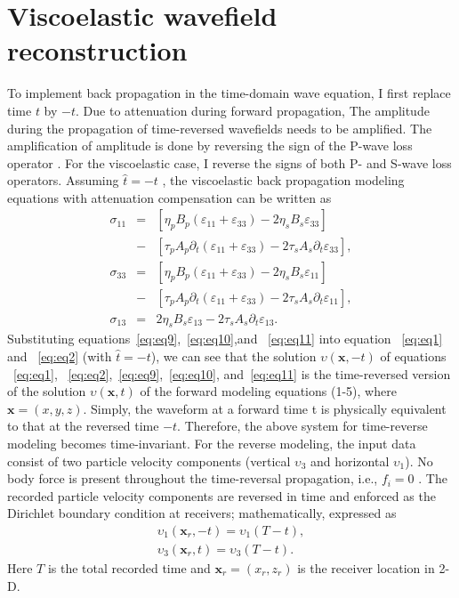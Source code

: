 \section{Viscoelastic wavefield reconstruction}
To implement back propagation in the time-domain wave equation, I first replace time $t$ by $-t$. Due to attenuation during forward propagation, The amplitude during the propagation of time-reversed wavefields needs to be amplified. The amplification of amplitude is done by reversing the sign of the P-wave loss operator \cite[]{zhu14b}. For the viscoelastic case, I reverse the signs of both P- and S-wave loss operators. Assuming $\hat{t}=-t$ , the viscoelastic back propagation modeling equations with attenuation compensation can be written as
\begin{eqnarray}                   
\sigma_{11} &=&\left [ \eta _pB_p(\varepsilon_{11}+\varepsilon_{33} )-2\eta _sB_s\varepsilon_{33}  \right ] \nonumber \\
&-&\left [ \tau _pA_p\partial _t (\varepsilon_{11}+\varepsilon_{33} )-2\tau _sA_s\partial _t \varepsilon_{33} \right ],\label{eq:eq9}\\        
\sigma _{33} &=&\left [ \eta _pB_p(\varepsilon_{11}+\varepsilon_{33} )-2\eta _sB_s\varepsilon_{11}  \right ] \nonumber \\
&-&\left [ \tau _pA_p\partial _t (\varepsilon_{11}+\varepsilon_{33} )-2\tau _sA_s\partial _t \varepsilon_{11} \right ],\label{eq:eq10}\\
\sigma _{13} &=&2\eta _sB_s\varepsilon_{13} - 2\tau _sA_s\partial _t \varepsilon_{13}.\label{eq:eq11}
\end{eqnarray}
Substituting equations~\ref{eq:eq9},~\ref{eq:eq10},and ~\ref{eq:eq11} into equation ~\ref{eq:eq1} and ~\ref{eq:eq2} (with $\hat{t}=-t$), we can see that the solution  $\upsilon(\mathbf{x},-t)$ of equations  ~\ref{eq:eq1}, ~\ref{eq:eq2},~\ref{eq:eq9},~\ref{eq:eq10}, and~\ref{eq:eq11} is the time-reversed version of the solution $\upsilon(\mathbf{x},t)$  of the forward modeling equations (1-5), where $\mathbf{x}=(x,y,z)$. Simply, the waveform at a forward time t is physically equivalent to that at the reversed time $-t$. Therefore, the above system for time-reverse modeling becomes time-invariant.
For the reverse modeling, the input data consist of two particle velocity components (vertical $\upsilon_3$ and horizontal $\upsilon_1$). No body force is present throughout the time-reversal propagation, i.e., $f_i=0$ . The recorded particle velocity components are reversed in time and enforced as the Dirichlet boundary condition at receivers; mathematically, expressed as
\begin{eqnarray}
\label{eq:eq12}  
 \upsilon_1(\mathbf{x}_r,-t)=\upsilon_1 (T-t),\\
\upsilon_3(\mathbf{x}_r,t)=\upsilon_3 (T-t).
\end{eqnarray}
Here $T$ is the total recorded time and $\mathbf{x}_r=(x_r,z_r)$ is the receiver location in 2-D.

